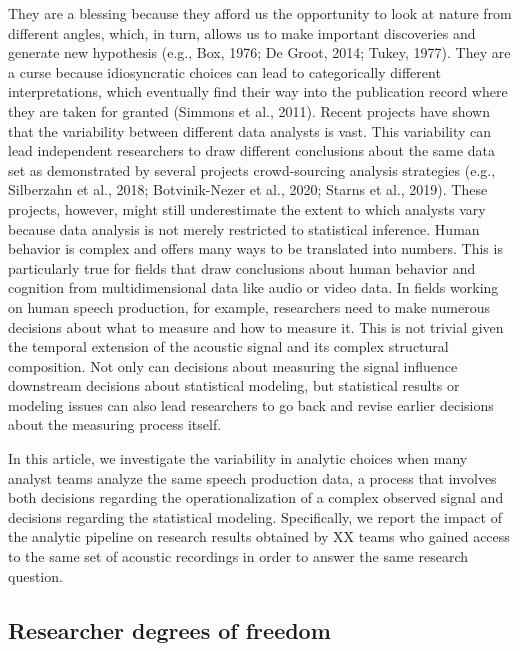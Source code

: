 \documentclass[
  english,
  man,floatsintext]{apa6}
\begin{document}
They are a blessing because they afford us the opportunity to look at nature from different angles, which, in turn, allows us to make important discoveries and generate new hypothesis (e.g., Box, 1976; De Groot, 2014; Tukey, 1977).
They are a curse because idiosyncratic choices can lead to categorically different interpretations, which eventually find their way into the publication record where they are taken for granted (Simmons et al., 2011).
Recent projects have shown that the variability between different data analysts is vast.
This variability can lead independent researchers to draw different conclusions about the same data set as demonstrated by several projects crowd-sourcing analysis strategies (e.g., Silberzahn et al., 2018; Botvinik-Nezer et al., 2020; Starns et al., 2019).
These projects, however, might still underestimate the extent to which analysts vary because data analysis is not merely restricted to statistical inference.
Human behavior is complex and offers many ways to be translated into numbers.
This is particularly true for fields that draw conclusions about human behavior and cognition from multidimensional data like audio or video data.
In fields working on human speech production, for example, researchers need to make numerous decisions about what to measure and how to measure it.
This is not trivial given the temporal extension of the acoustic signal and its complex structural composition.
Not only can decisions about measuring the signal influence downstream decisions about statistical modeling, but statistical results or modeling issues can also lead researchers to go back and revise earlier decisions about the measuring process itself.

In this article, we investigate the variability in analytic choices when many analyst teams analyze the same speech production data, a process that involves both decisions regarding the operationalization of a complex observed signal and decisions regarding the statistical modeling.
Specifically, we report the impact of the analytic pipeline on research results obtained by XX teams who gained access to the same set of acoustic recordings in order to answer the same research question.

\hypertarget{researcher-degrees-of-freedom}{%
\subsection{Researcher degrees of freedom}\label{researcher-degrees-of-freedom}}
\end{document}
